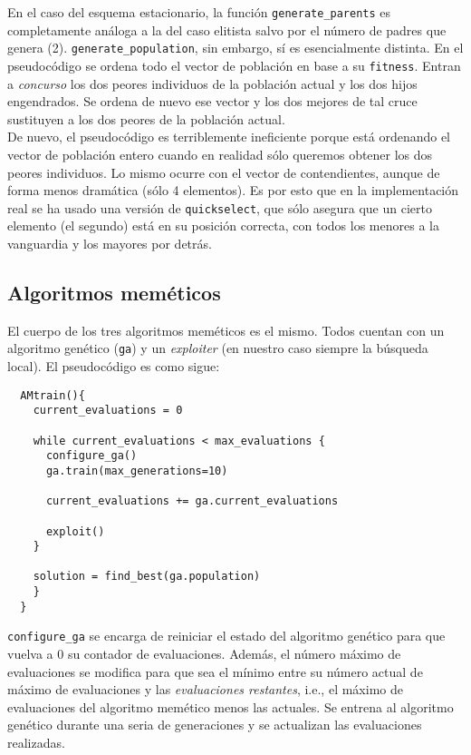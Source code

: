 \documentclass[11pt]{article}
\theoremstyle{plain}
\theoremstyle{definition}
\begin{document}
En el caso del esquema estacionario, la función \texttt{generate\_parents} es completamente análoga a la del caso elitista salvo por el número de padres que genera (2). \texttt{generate\_population}, sin embargo, sí es esencialmente distinta. En el pseudocódigo se ordena todo el vector de población en base a su \texttt{fitness}. Entran a \textit{concurso} los dos peores individuos de la población actual y los dos hijos engendrados. Se ordena de nuevo ese vector y los dos mejores de tal cruce sustituyen a los dos peores de la población actual. \\

De nuevo, el pseudocódigo es terriblemente ineficiente porque está ordenando el vector de población entero cuando en realidad sólo queremos obtener los dos peores individuos. Lo mismo ocurre con el vector de contendientes, aunque de forma menos dramática (sólo 4 elementos). Es por esto que en la implementación real se ha usado una versión de \texttt{quickselect}, que sólo asegura que un cierto elemento (el segundo) está en su posición correcta, con todos los menores a la vanguardia y los mayores por detrás. \\

\subsection{Algoritmos meméticos}

El cuerpo de los tres algoritmos meméticos es el mismo. Todos cuentan con un algoritmo genético (\texttt{ga}) y un \textit{exploiter} (en nuestro caso siempre la búsqueda local). El pseudocódigo es como sigue: \\

\begin{lstlisting}
  AMtrain(){
    current_evaluations = 0

    while current_evaluations < max_evaluations {
      configure_ga()
      ga.train(max_generations=10)

      current_evaluations += ga.current_evaluations

      exploit()
    }

    solution = find_best(ga.population)
    }
  }
\end{lstlisting}

\texttt{configure\_ga} se encarga de reiniciar el estado del algoritmo genético para que vuelva a 0 su contador de evaluaciones. Además, el número máximo de evaluaciones se modifica para que sea el mínimo entre su número actual de máximo de evaluaciones y las \textit{evaluaciones restantes}, i.e., el máximo de evaluaciones del algoritmo memético menos las actuales. Se entrena al algoritmo genético durante una seria de generaciones y se actualizan las evaluaciones realizadas.
\end{document}
